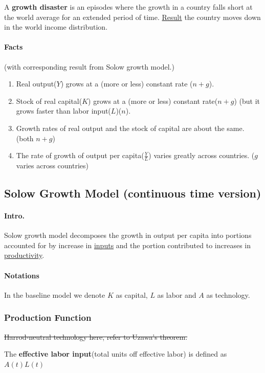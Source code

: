 \documentclass[]{article}
\begin{document}
        \begin{definition}
            A \textbf{growth disaster} is an episodes where the growth in a country falls short at the world average for an extended period of time. \ul{Result} the country moves down in the world income distribution.
        \end{definition}
    
        \paragraph{Facts}(with corresponding result from Solow growth model.)
        \begin{enumerate}
            \item Real output($Y$) grows at a (more or less) constant rate ($n+g$).
            \item Stock of real capital($K$) grows at a (more or less) constant rate($n+g$) (but it grows faster than labor input($L$)($n$).
            \item Growth rates of real output and the stock of capital are about the same. (both $n+g$)
            \item The rate of growth of output per capita($\frac{Y}{L}$) varies greatly across countries. ($g$ varies across countries)
        \end{enumerate}
        
        \subsection{Solow Growth Model (continuous time version)}
            \paragraph{Intro.} Solow growth model decomposes the growth in output per capita into portions accounted for by increase in \ul{inputs} and the portion contributed to increases in \ul{productivity}.
           
            \paragraph{Notations} In the baseline model we denote $K$ as capital, $L$ as labor and $A$ as technology.
            
        \subsubsection{Production Function}
            \begin{remark}
                \st{Harrod-neutral technology here, refer to Uzawa's theorem.}
            \end{remark}
            \begin{definition}
                The \textbf{effective labor input}(total units off effective labor) is defined as $A(t)L(t)$
            \end{definition}
            
\end{document}
